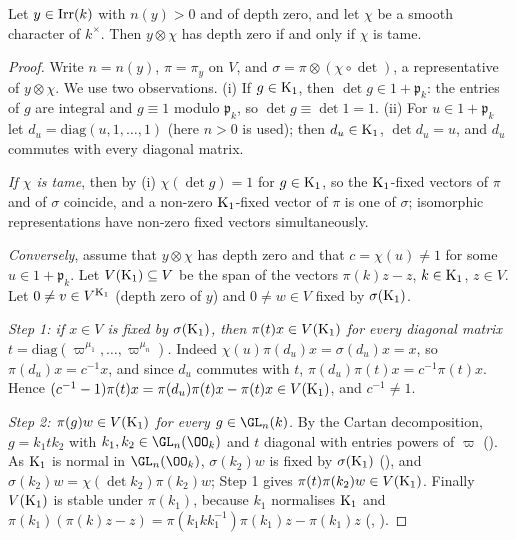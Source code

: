 \begin{proposition}\label{pf:sh-misc:twtame}
Let $y\in\operatorname{Irr}(k)$ with $n(y)>0$ and of depth zero, and let $\chi$ be a smooth character of $k^\times$. Then $y\otimes\chi$ has depth zero
if and only if $\chi$ is tame.
\end{proposition}

\begin{proof}
Write $n=n(y)$, $\pi=\pi_y$ on $V$, and $\sigma=\pi\otimes(\chi\circ\det)$, a representative of $y\otimes\chi$. We use two observations.
(i) If $g\in\mathrm{K}_1$, then $\det g\in1+\mathfrak p_k$: the entries of $g$ are integral and $g\equiv1$ modulo $\mathfrak p_k$, so
$\det g\equiv\det1=1$. (ii) For $u\in1+\mathfrak p_k$ let $d_u=\mathrm{diag}(u,1,\dots,1)$ (here $n>0$ is used); then $d_u\in\mathrm{K}_1$,
$\det d_u=u$, and $d_u$ commutes with every diagonal matrix.

\emph{If $\chi$ is tame}, then by (i) $\chi(\det g)=1$ for $g\in\mathrm{K}_1$, so the $\mathrm{K}_1$-fixed vectors of $\pi$ and of $\sigma$ coincide, and a non-zero
$\mathrm{K}_1$-fixed vector of $\pi$ is one of $\sigma$; isomorphic representations have non-zero fixed vectors simultaneously.

\emph{Conversely}, assume that $y\otimes\chi$ has depth zero and that $c=\chi(u)\ne1$ for some $u\in1+\mathfrak p_k$. Let
$V(\mathrm{K}_1)\subseteq V$ be the span of the vectors $\pi(k)z-z$, $k\in\mathrm{K}_1$, $z\in V$. Let $0\ne v\in V^{\mathrm{K}_1}$ (depth zero of $y$) and
$0\ne w\in V$ fixed by $\sigma(\mathrm{K}_1)$.

\emph{Step 1: if $x\in V$ is fixed by $\sigma(\mathrm{K}_1)$, then $\pi(t)x\in V(\mathrm{K}_1)$ for every diagonal matrix $t=\mathrm{diag}(\varpi^{\mu_1},
\dots,\varpi^{\mu_n})$.} Indeed $\chi(u)\pi(d_u)x=\sigma(d_u)x=x$, so $\pi(d_u)x=c^{-1}x$, and since $d_u$ commutes with $t$,
$\pi(d_u)\pi(t)x=c^{-1}\pi(t)x$. Hence $(c^{-1}-1)\pi(t)x=\pi(d_u)\pi(t)x-\pi(t)x\in V(\mathrm{K}_1)$, and $c^{-1}\ne1$.

\emph{Step 2: $\pi(g)w\in V(\mathrm{K}_1)$ for every $g\in\GL_n(k)$.} By the Cartan decomposition, $g=k_1tk_2$ with $k_1,k_2\in\GL_n(\OO_k)$ and $t$
diagonal with entries powers of $\varpi$ (). As $\mathrm{K}_1$ is normal in
$\GL_n(\OO_k)$, $\sigma(k_2)w$ is fixed by $\sigma(\mathrm{K}_1)$ (), and
$\sigma(k_2)w=\chi(\det k_2)\pi(k_2)w$; Step 1 gives $\pi(t)\pi(k_2)w\in V(\mathrm{K}_1)$. Finally $V(\mathrm{K}_1)$ is stable under $\pi(k_1)$, because
$k_1$ normalises $\mathrm{K}_1$ and $\pi(k_1)(\pi(k)z-z)=\pi(k_1kk_1^{-1})\pi(k_1)z-\pi(k_1)z$
(, ).


\end{proof}
